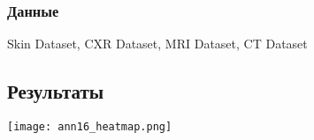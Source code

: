 \subsubsection*{Данные}
Skin Dataset, CXR Dataset, MRI Dataset, CT Dataset
\subsection*{Результаты}

    
    


    
    


\begin{minipage}{1.0\linewidth}
    \begin{center}
        \texttt{[image: ann16\_heatmap.png]} \\
    \end{center}
    
\end{minipage} 
